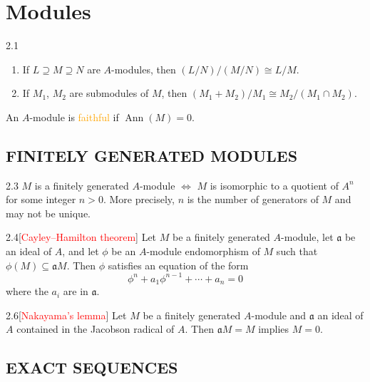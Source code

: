 \chapter{Modules}

\begin{proposition}{2.1}
	\begin{enumerate}[label=\textup{(\roman*)}]
		\item If $L\supseteq M\supseteq N$ are $A$-modules, then $(L/N)/(M/N)\cong L/M$.
		\item If $M_1$, $M_2$ are submodules of $M$, then $\left(M_1+M_2\right)/M_1\cong M_2/\left(M_1\cap M_2\right)$.
	\end{enumerate}
\end{proposition}

An $A$-module is \textcolor{orange}{faithful} if $\operatorname{Ann}(M)=0$.

\section*{FINITELY GENERATED MODULES}

\begin{proposition}{2.3}
	$M$ is a finitely generated $A$-module $\Leftrightarrow$ $M$ is isomorphic to a quotient of $A^n$ for some integer $n>0$. More precisely, $n$ is the number of generators of $M$ and may not be unique.
\end{proposition}

\begin{proposition}{2.4}[\textcolor{red}{Cayley–Hamilton theorem}]
	Let $M$ be a finitely generated $A$-module, let $\mathfrak{a}$ be an ideal of $A$, and let $\phi$ be an $A$-module endomorphism of $M$ such that $\phi(M)\subseteq\mathfrak{a}M$. Then $\phi$ satisfies an equation of the form
	\begin{equation*}
		\phi^n+a_1\phi^{n-1}+\cdots+a_n=0
	\end{equation*}
	where the $a_i$ are in $\mathfrak{a}$.
\end{proposition}

\begin{proposition}{2.6}[\textcolor{red}{Nakayama's lemma}]
	Let $M$ be a finitely generated $A$-module and $\mathfrak{a}$ an ideal of $A$ contained in the Jacobson radical of $A$. Then $\mathfrak{a}M=M$ implies $M=0$.
\end{proposition}

\section*{EXACT SEQUENCES}

